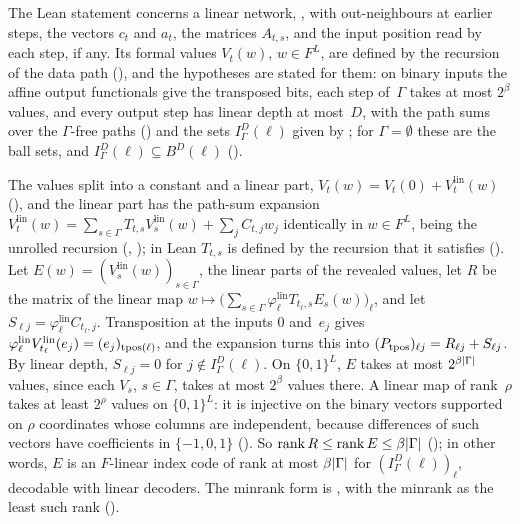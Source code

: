\begin{outline}
The Lean statement concerns a linear network, , with out-neighbours at earlier steps, the vectors $c_t$ and
$a_t$, the matrices $A_{t,s}$, and the input position read by each step, if any. Its formal values $V_t(w)$, $w\in F^L$, are
defined by the recursion of the data path (), and the hypotheses are stated for them: on binary inputs the
affine output functionals give the transposed bits, each step of~$\Gamma$ takes at most $2^\beta$ values, and every output
step has linear depth at most~$D$, with the path sums  over the $\Gamma$-free paths () and
the sets $I^D_\Gamma(\ell)$ given by ; for $\Gamma=\emptyset$ these are the ball sets, and
$I^D_\Gamma(\ell)\subseteq B^D(\ell)$ ().

The values split into a constant and a linear part, $V_t(w)=V_t(0)+V^{\mathrm{lin}}_t(w)$ (), and the
linear part has the path-sum expansion
$V^{\mathrm{lin}}_t(w)=\sum_{s\in\Gamma}T_{t,s}V^{\mathrm{lin}}_s(w)+\sum_jC_{t,j}w_j$ identically in $w\in F^L$, being the
unrolled recursion (, ); in Lean $T_{t,s}$ is defined by the recursion that it
satisfies (). Let $E(w)=(V^{\mathrm{lin}}_s(w))_{s\in\Gamma}$, the linear parts of the revealed values, let
$R$ be the matrix of the linear map $w\mapsto\bigl(\sum_{s\in\Gamma}\varphi_\ell^{\mathrm{lin}}T_{t_\ell,s}E_s(w)\bigr)_\ell$,
and let $S_{\ell j}=\varphi_\ell^{\mathrm{lin}}C_{t_\ell,j}$. Transposition at the inputs $0$ and~$e_j$ gives
$\varphi_\ell^{\mathrm{lin}}V^{\mathrm{lin}}_{t_\ell}(e_j)=(e_j)_{\operatorname{tpos}(\ell)}$, and the expansion turns this into
$(P_{\operatorname{tpos}})_{\ell j}=R_{\ell j}+S_{\ell j}$. By linear depth, $S_{\ell j}=0$ for $j\notin I^D_\Gamma(\ell)$. On $\{0,1\}^L$,
$E$ takes at most $2^{\beta\lvert \Gamma \rvert}$ values, since each $V_s$, $s\in\Gamma$, takes at most $2^\beta$ values there. A
linear map of rank~$\rho$ takes at least $2^\rho$ values on $\{0,1\}^L$: it is injective on the binary vectors supported on
$\rho$ coordinates whose columns are independent, because differences of such vectors have coefficients in $\{-1,0,1\}$
(). So $\operatorname{rank} R\le\operatorname{rank} E\le\beta\lvert \Gamma \rvert$ (); in other words, $E$
is an $F$-linear index code of rank at most $\beta\lvert \Gamma \rvert$ for $(I^D_\Gamma(\ell))_\ell$, decodable with linear decoders.
The minrank form is , with the minrank as the least such rank ().
\end{outline}

